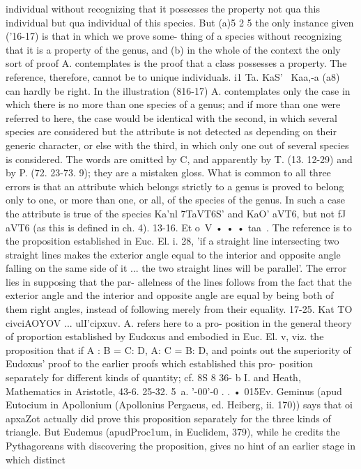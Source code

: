 {{{{{{individual without recognizing that it possesses the property not
qua this individual but qua individual of this species. But (a)5 2 5
the only instance given ('16-17) is that in which we prove some-
thing of a species without recognizing that it is a property of the
genus, and (b) in the whole of the context the only sort of proof
A. contemplates is the proof that a class possesses a property.
The reference, therefore, cannot be to unique individuals.
i1 Ta. KaS' ~Kaa,-a (a8) can hardly be right. In the illustration
(816-17) A. contemplates only the case in which there is no more
than one species of a genus; and if more than one were referred
to here, the case would be identical with the second, in which
several species are considered but the attribute is not detected
as depending on their generic character, or else with the third,
in which only one out of several species is considered. The words
are omitted by C, and apparently by T. (13. 12-29) and by P.
(72. 23-73. 9); they are a mistaken gloss.
What is common to all three errors is that an attribute which
belongs strictly to a genus is proved to belong only to one, or
more than one, or all, of the species of the genus. In such a case
the attribute is true of the species Ka'nl 7TaVT6S' and KaO' aVT6, but
not fJ aVT6 (as this is defined in ch. 4).
13-16. Et o~V • • • taa~. The reference is to the proposition
established in Euc. El. i. 28, 'if a straight line intersecting two
straight lines makes the exterior angle equal to the interior and
opposite angle falling on the same side of it ... the two straight
lines will be parallel'. The error lies in supposing that the par-
allelness of the lines follows from the fact that the exterior angle
and the interior and opposite angle are equal by being both of
them right angles, instead of following merely from their equality.
17-25. Kat TO civciAOYOV ... ulI'cipxuv. A. refers here to a pro-
position in the general theory of proportion established by
Eudoxus and embodied in Euc. El. v, viz. the proposition that if
A : B = C: D, A: C = B: D, and points out the superiority of
Eudoxus' proof to the earlier proofs which established this pro-
position separately for different kinds of quantity; cf. 8S 8 36- b I.
and Heath, Mathematics in Aristotle, 43-6.
25-32. 5~a. '-00'-0 . . • 015Ev. Geminus (apud Eutocium in
Apollonium (Apollonius Pergaeus, ed. Heiberg, ii. 170)) says that
oi apxaZot actually did prove this proposition separately for the
three kinds of triangle. But Eudemus (apudProc1um, in Euclidem,
379), while he credits the Pythagoreans with discovering the
proposition, gives no hint of an earlier stage in which distinct
}}}}}}
